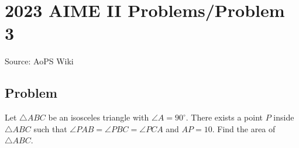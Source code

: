 \documentclass[12pt]{article}
\begin{document}
\section*{{2023 AIME II Problems/Problem 3}}
Source: AoPS Wiki

\subsection*{Problem}
Let $\triangle ABC$ be an isosceles triangle with $\angle A = 90^\circ.$ There exists a point $P$ inside $\triangle ABC$ such that $\angle PAB = \angle PBC = \angle PCA$ and $AP = 10.$ Find the area of $\triangle ABC.$
\end{document}

